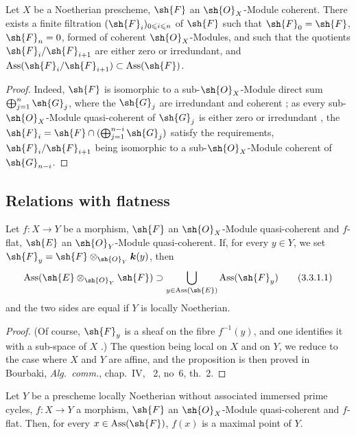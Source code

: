 \begin{corollary}[3.2.8]
\label{IV.3.2.8}
Let $X$ be a Noetherian prescheme, $\sh{F}$ an $\sh{O}_X$-Module coherent.
There exists a finite filtration $(\sh{F}_i)_{0\leqslant i\leqslant n}$ of $\sh{F}$ such that $\sh{F}_0=\sh{F}$, $\sh{F}_n=0$, formed of coherent $\sh{O}_X$-Modules, and such that the quotients $\sh{F}_i/\sh{F}_{i+1}$ are either zero or irredundant, and $\operatorname{Ass}(\sh{F}_i/\sh{F}_{i+1})\subset\operatorname{Ass}(\sh{F})$.
\end{corollary}

\begin{proof}
Indeed, $\sh{F}$ is isomorphic to a sub-$\sh{O}_X$-Module direct sum $\bigoplus_{j=1}^n\sh{G}_j$, where the $\sh{G}_j$ are irredundant and coherent ; as every sub-$\sh{O}_X$-Module quasi-coherent of $\sh{G}_j$ is either zero or irredundant , the $\sh{F}_i=\sh{F}\cap(\bigoplus_{j=1}^{n-i}\sh{G}_j)$ satisfy the requirements, $\sh{F}_i/\sh{F}_{i+1}$ being isomorphic to a sub-$\sh{O}_X$-Module coherent of $\sh{G}_{n-i}$.
\end{proof}

\subsection{Relations with flatness}
\label{subsection:IV.3.3}

\begin{proposition}[3.3.1]
\label{IV.3.3.1}
Let $f:X\to Y$ be a morphism, $\sh{F}$ an $\sh{O}_X$-Module quasi-coherent and $f$-flat, $\sh{E}$ an $\sh{O}_Y$-Module quasi-coherent.
If, for every $y\in Y$, we set $\sh{F}_y=\sh{F}\otimes_{\sh{O}_Y}\boldsymbol{k}(y)$, then
\[
\label{IV.3.3.1.1}
\operatorname{Ass}(\sh{E}\otimes_{\sh{O}_Y}\sh{F})\supset\bigcup_{y\in\operatorname{Ass}(\sh{E})}\operatorname{Ass}(\sh{F}_y)
\tag{3.3.1.1}
\]
and the two sides are equal if $Y$ is locally Noetherian.
\end{proposition}

\begin{proof}
(Of course, $\sh{F}_y$ is a sheaf on the fibre $f^{-1}(y)$, and one identifies it with a sub-space of $X$ .)
The question being local on $X$ and on $Y$, we reduce to the case where $X$ and $Y$ are affine, and the proposition is then proved in Bourbaki, \emph{Alg.\ comm.}, chap.~IV, \textsection~2, no~6, th.~2.
\end{proof}

\begin{corollary}[3.3.2]
\label{IV.3.3.2}
Let $Y$ be a prescheme locally Noetherian without associated immersed prime cycles, $f:X\to Y$ a morphism, $\sh{F}$ an $\sh{O}_X$-Module quasi-coherent and $f$-flat.
Then, for every $x\in\operatorname{Ass}(\sh{F})$, $f(x)$ is a maximal point of $Y$.
\end{corollary}

